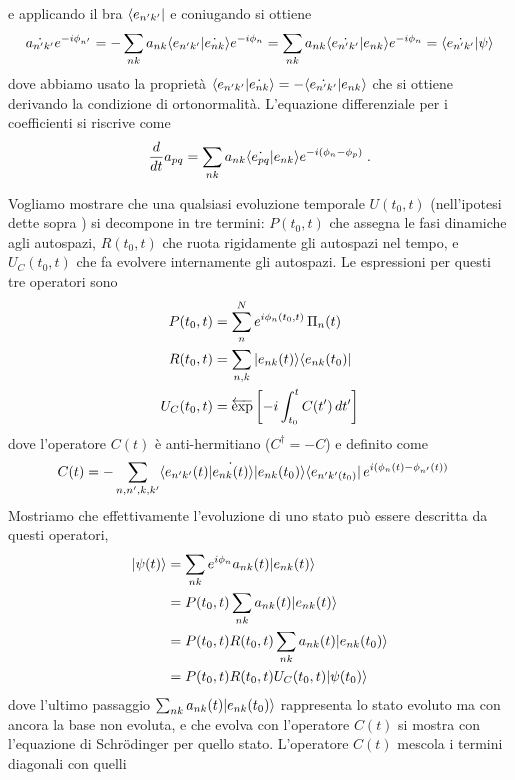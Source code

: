e applicando il bra $ \langle e_{n'k'} \vert $ e coniugando si ottiene
\begin{align*}
  \dot{a_{n'k'}} e^{-i \phi_{n'}} = - \sum_{nk} a_{nk} \bk{e_{n'k'} | \dot{e_{nk}}} e^{-i\phi_n} 
  = \sum_{nk} a_{nk} \bk{\dot{e_{n'k'}} | {e_{nk}}} e^{-i\phi_n} = \bk{\dot{e_{n'k'}} | \psi}
\end{align*}
dove abbiamo usato la proprietà $  \langle e_{n'k'} | \dot{e_{nk}} \rangle = - \langle \dot{e_{n'k'}} | {e_{nk}} \rangle $ che si ottiene derivando la condizione di 
ortonormalità. L'equazione differenziale per i coefficienti si riscrive come 
\begin{align*}
  \frac{d}{dt} a_{pq} = \sum_{nk} a_{nk} \bk{\dot{e_{pq}} | {e_{nk}}} e^{-i(\phi_n - \phi_p)}\;.
\end{align*}

Vogliamo mostrare che una qualsiasi evoluzione temporale $ U(t_0,t) $ (nell'ipotesi dette sopra ) si decompone in tre termini: $ P(t_0,t) $ 
che assegna le fasi dinamiche agli autospazi, $ R(t_0,t) $ che ruota rigidamente gli autospazi nel tempo, e $ U_C(t_0,t) $ che fa evolvere internamente 
gli autospazi. Le espressioni per questi tre operatori sono 
\begin{align*}
  P(t_0,t) &= \sum_{n}^N e^{i \phi_n (t_0,t)} \, \Pi_n(t) 
  \\
  R(t_0,t) &= \sum_{n,k} \k{e_{nk}(t) } \b{e_{nk}(t_0)}
  \\
  U_C(t_0,t) &= \Texp\left[ -i \int_{t_0}^t C(t')\,dt' \right]
\end{align*}
dove l'operatore $ C(t) $ è anti-hermitiano ($ C^\dag = - C $) e definito come 
\begin{align*}
  C(t) &= - \sum_{n,n',k,k'} \bk{e_{n'k'}(t) |\dot{ e_{nk}(t)}} \k{e_{nk}(t_0)} \b{e_{n'k'(t_0)}} \,e^{ i(\phi_n(t) - \phi_{n'}(t))}
\end{align*}
Mostriamo che effettivamente l'evoluzione di uno stato può essere descritta da questi operatori,
\begin{align*}
  \k{\psi(t)} &= \sum_{nk} e^{i \phi_n} a_{nk}(t) \k{e_{nk}(t)} 
  \\
  &= P(t_0,t) \sum_{nk} a_{nk}(t) \k{e_{nk}(t)}
  \\
  &=  P(t_0,t) R(t_0,t) \sum_{nk} a_{nk}(t) \k{e_{nk}(t_0)} 
  \\
  &= P(t_0,t) R(t_0,t) U_C(t_0,t) \k{\psi(t_0)}
\end{align*}
dove l'ultimo passaggio $ \sum_{nk} a_{nk}(t) \vert e_{nk}(t_0) \rangle $ rappresenta lo stato evoluto ma con ancora la base non evoluta, e che evolva con 
l'operatore $ C(t) $ si mostra con l'equazione di Schrödinger per quello stato. L'operatore $ C(t) $ mescola i termini diagonali con quelli 
